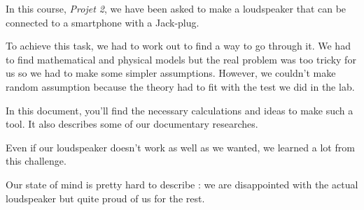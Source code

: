 

\begin{abstract-en}

In this course, \textit{Projet 2}, we have been asked to make a loudspeaker that can be connected to a smartphone with a Jack-plug.

To achieve this task, we had to work out to find a way to go through it.
We had to find mathematical and physical models but the real problem was too tricky for us so we had to make some simpler assumptions.
However, we couldn't make random assumption because the theory had to fit with the test we did in the lab.

In this document, you'll find the necessary calculations and ideas to make such a tool. It also describes some
of our documentary researches.

Even if our loudspeaker doesn't work as well as we wanted, we learned a lot from this challenge. 

Our state of mind is pretty hard to describe : we are disappointed with the actual loudspeaker but quite proud of us for the rest.

\end{abstract-en}


